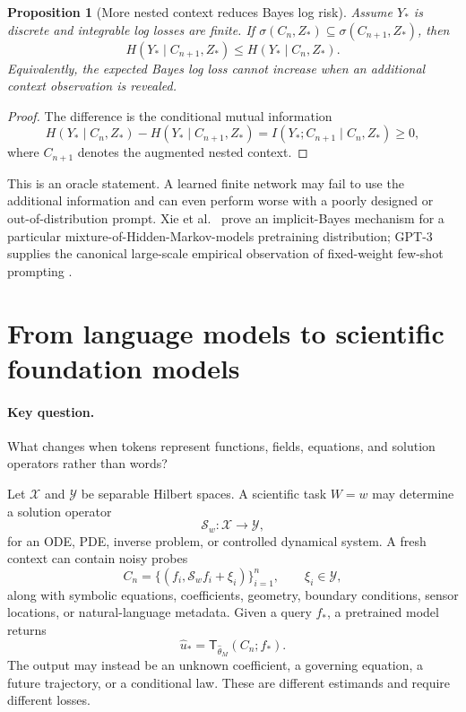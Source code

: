 \documentclass[11pt]{amsart}
\numberwithin{equation}{section}
\theoremstyle{definition}
\theoremstyle{plain}
\newtheorem{proposition}[definition]{Proposition}
\theoremstyle{remark}
\newcommand{\cS}{\mathcal{S}}
\newcommand{\cX}{\mathcal{X}}
\newcommand{\cY}{\mathcal{Y}}
\begin{document}
\begin{proposition}[More nested context reduces Bayes log risk]
\label{prop:context-entropy}
Assume $Y_*$ is discrete and integrable log losses are finite.  If
$\sigma(C_n,Z_*)\subseteq\sigma(C_{n+1},Z_*)$, then
\begin{equation}\label{eq:entropy-monotonicity}
 H(Y_*\mid C_{n+1},Z_*)
 \le H(Y_*\mid C_n,Z_*).
\end{equation}
Equivalently, the expected Bayes log loss cannot increase when an additional
context observation is revealed.
\end{proposition}

\begin{proof}
The difference is the conditional mutual information
\[
 H(Y_*\mid C_n,Z_*)-H(Y_*\mid C_{n+1},Z_*)
 =I(Y_*;C_{n+1}\mid C_n,Z_*)\ge0,
\]
where $C_{n+1}$ denotes the augmented nested context.
\end{proof}

This is an oracle statement.  A learned finite network may fail to use the
additional information and can even perform worse with a poorly designed or
out-of-distribution prompt.  Xie et al.~\cite{XieEtAl2022} prove an
implicit-Bayes mechanism for a particular mixture-of-Hidden-Markov-models
pretraining distribution; GPT-3 supplies the canonical large-scale empirical
observation of fixed-weight few-shot prompting \cite{BrownEtAl2020}.


\section{From language models to scientific foundation models}
\label{sec:scientific-fm}

\paragraph{\textbf{Key question.}}
What changes when tokens represent functions, fields, equations, and solution
operators rather than words?

Let $\cX$ and $\cY$ be separable Hilbert spaces.  A scientific task $W=w$ may
determine a solution operator
\begin{equation}\label{eq:scientific-operator}
 \cS_w:\cX\longrightarrow\cY,
\end{equation}
for an ODE, PDE, inverse problem, or controlled dynamical system.  A fresh
context can contain noisy probes
\begin{equation}\label{eq:scientific-context}
 C_n=\{(f_i,\cS_wf_i+\xi_i)\}_{i=1}^n,
 \qquad \xi_i\in\cY,
\end{equation}
along with symbolic equations, coefficients, geometry, boundary conditions,
sensor locations, or natural-language metadata.  Given a query $f_*$, a
pretrained model returns
\begin{equation}\label{eq:scientific-action}
 \widehat u_*
 =\mathsf T_{\widehat\theta_M}(C_n;f_*).
\end{equation}
The output may instead be an unknown coefficient, a governing equation, a
future trajectory, or a conditional law.  These are different estimands and
require different losses.
\end{document}
